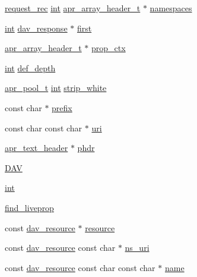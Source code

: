 \begin{DoxyCompactItemize}
\item 
\hyperlink{structrequest__rec}{request\+\_\+rec} \hyperlink{pcre_8txt_a42dfa4ff673c82d8efe7144098fbc198}{int} \hyperlink{structapr__array__header__t}{apr\+\_\+array\+\_\+header\+\_\+t} $\ast$ \hyperlink{group__MOD__DAV_ga693d7e57299e41429256463b6978cfd6}{namespaces}
\item 
\hyperlink{pcre_8txt_a42dfa4ff673c82d8efe7144098fbc198}{int} \hyperlink{structdav__response}{dav\+\_\+response} $\ast$ \hyperlink{group__MOD__DAV_gae5e6e8bc4bfa800414992418716f96df}{first}
\item 
\hyperlink{structapr__array__header__t}{apr\+\_\+array\+\_\+header\+\_\+t} $\ast$ \hyperlink{group__MOD__DAV_ga558264c251695440cf0314f8fee98ee9}{prop\+\_\+ctx}
\item 
\hyperlink{pcre_8txt_a42dfa4ff673c82d8efe7144098fbc198}{int} \hyperlink{group__MOD__DAV_gacbd5af9ff1f1068fb0f530217a8f5b40}{def\+\_\+depth}
\item 
\hyperlink{structapr__pool__t}{apr\+\_\+pool\+\_\+t} \hyperlink{pcre_8txt_a42dfa4ff673c82d8efe7144098fbc198}{int} \hyperlink{group__MOD__DAV_gadde0088b83bfa79d60a5603dd8f1c6c1}{strip\+\_\+white}
\item 
const char $\ast$ \hyperlink{group__MOD__DAV_ga5b41c5ae4505891e6c53e26df197e02b}{prefix}
\item 
const char const char $\ast$ \hyperlink{group__MOD__DAV_ga69ec24fb2d0a5f5e532deb9adaab81d6}{uri}
\item 
\hyperlink{structapr__text__header}{apr\+\_\+text\+\_\+header} $\ast$ \hyperlink{group__MOD__DAV_ga08f35dafe4ef680fc79b6e69d71c8f90}{phdr}
\item 
\hyperlink{group__MOD__DAV_gab3d9c9436d79e6e827e3d828f67f6053}{D\+AV}
\item 
\hyperlink{group__MOD__DAV_ga61569f2965b7a369eb10b6d75d410d11}{int}
\item 
\hyperlink{group__MOD__DAV_gaf47594d1c8656da141d16c249230f9bc}{find\+\_\+liveprop}
\item 
const \hyperlink{structdav__resource}{dav\+\_\+resource} $\ast$ \hyperlink{group__MOD__DAV_gace5ccd456846e6c0fdd4da4136bd9a44}{resource}
\item 
const \hyperlink{structdav__resource}{dav\+\_\+resource} const char $\ast$ \hyperlink{group__MOD__DAV_ga08d1a5845fd4b9e4370e9423ecb88d75}{ns\+\_\+uri}
\item 
const \hyperlink{structdav__resource}{dav\+\_\+resource} const char const char $\ast$ \hyperlink{group__MOD__DAV_ga8f8f80d37794cde9472343e4487ba3eb}{name}
\item 

\end{DoxyCompactItemize}
